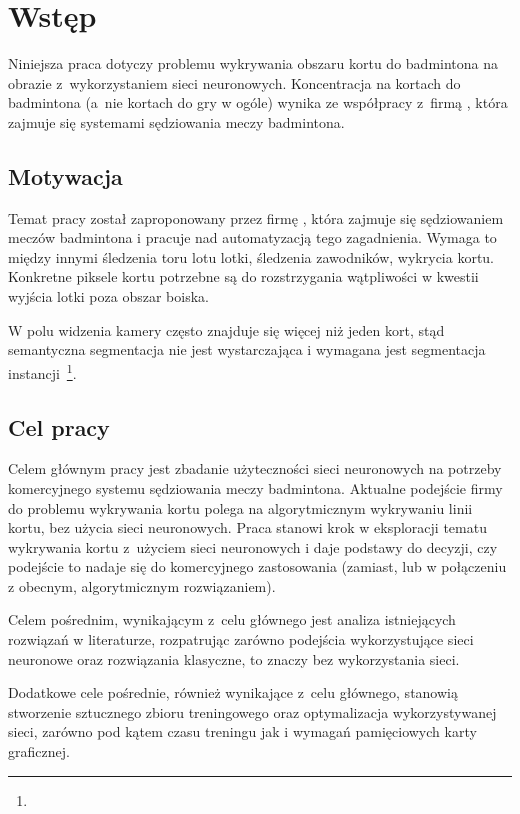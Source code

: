 \chapter{Wstęp}

Niniejsza praca dotyczy problemu wykrywania obszaru kortu do badmintona na obrazie z~wykorzystaniem sieci neuronowych.
Koncentracja na kortach do badmintona (a~nie kortach do gry w ogóle) wynika ze współpracy z~firmą \blue{}, która zajmuje się systemami sędziowania meczy badmintona.

\section{Motywacja}

Temat pracy został zaproponowany przez firmę \blue{}, która zajmuje się sędziowaniem meczów badmintona i pracuje nad automatyzacją tego zagadnienia.
Wymaga to między innymi śledzenia toru lotu lotki, śledzenia zawodników, wykrycia kortu.
Konkretne piksele kortu potrzebne są do rozstrzygania wątpliwości w kwestii wyjścia lotki poza obszar boiska.

W polu widzenia kamery często znajduje się więcej niż jeden kort, stąd semantyczna segmentacja nie jest wystarczająca i wymagana jest segmentacja instancji~\footnote{}.

\section{Cel pracy}

Celem głównym pracy jest zbadanie użyteczności sieci neuronowych na potrzeby komercyjnego systemu sędziowania meczy badmintona.
Aktualne podejście firmy \blue{} do problemu wykrywania kortu polega na algorytmicznym wykrywaniu linii kortu, bez użycia sieci neuronowych.
Praca stanowi krok w eksploracji tematu wykrywania kortu z~użyciem sieci neuronowych i daje podstawy do decyzji, czy podejście to nadaje się do komercyjnego zastosowania (zamiast, lub w połączeniu z obecnym, algorytmicznym rozwiązaniem).

Celem pośrednim, wynikającym z~celu głównego jest analiza istniejących rozwiązań w literaturze, rozpatrując zarówno podejścia wykorzystujące sieci neuronowe oraz rozwiązania klasyczne, to znaczy bez wykorzystania sieci.

Dodatkowe cele pośrednie, również wynikające z~celu głównego, stanowią stworzenie sztucznego zbioru treningowego oraz optymalizacja wykorzystywanej sieci, zarówno pod kątem czasu treningu jak i wymagań pamięciowych karty graficznej.


